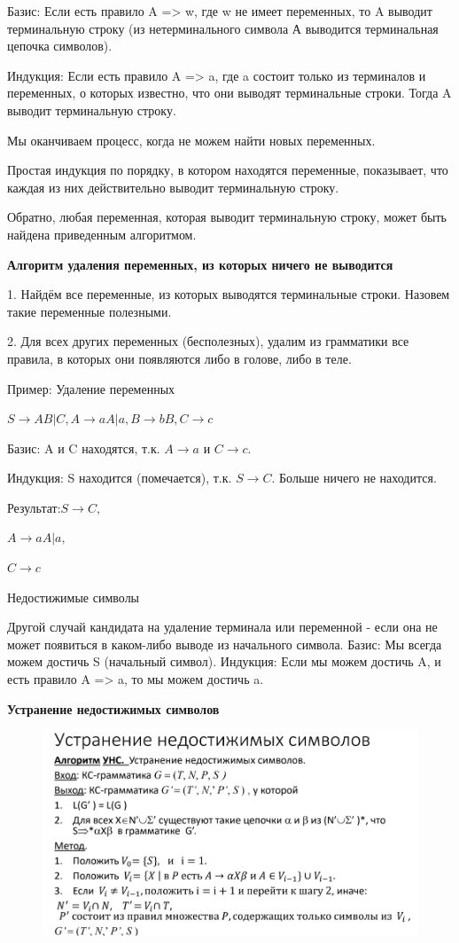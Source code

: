 \documentclass{article}
\begin{document}
 Базис: Если есть правило A => w, где w не имеет переменных, то A
выводит терминальную строку (из нетерминального символа А
выводится терминальная цепочка символов).

 Индукция: Если есть правило A => a, где a состоит только из
терминалов и переменных, о которых известно, что они выводят
терминальные строки. Тогда A выводит терминальную строку.

 Мы оканчиваем процесс, когда не можем найти новых переменных.

 Простая индукция по порядку, в котором находятся переменные,
показывает, что каждая из них действительно выводит терминальную
строку.

 Обратно, любая переменная, которая выводит терминальную строку,
может быть найдена приведенным алгоритмом.


\textbf{Алгоритм удаления переменных, из которых
ничего не выводится}

1. Найдём все переменные, из которых выводятся
терминальные строки. Назовем такие переменные
полезными.

2. Для всех других переменных (бесполезных), удалим из
грамматики все правила, в которых они появляются либо
в голове, либо в теле.


Пример: Удаление переменных

$S \rightarrow AB | C, A \rightarrow aA | a, B \rightarrow bB, C \rightarrow c$

 Базис: A и C находятся, т.к. $A \rightarrow a$ и $ C \rightarrow c.$

 Индукция: S находится (помечается), т.к. $S \rightarrow C.$
 Больше ничего не находится.

 Результат:$ S \rightarrow C,$

 $A \rightarrow aA | a,$

 $C \rightarrow c$



Недостижимые символы

 Другой случай кандидата на удаление терминала или
переменной - если она не может появиться в каком-либо
выводе из начального символа.
 Базис: Мы всегда можем достичь S (начальный символ).
 Индукция: Если мы можем достичь A, и есть правило A => a,
то мы можем достичь a.

\textbf{Устранение недостижимых символов}
\begin{figure}[H]
    \centering
    \includegraphics[width=0.50\linewidth]{Снимок экрана 2025-04-17 084851.png}
\end{figure}
\end{document}
